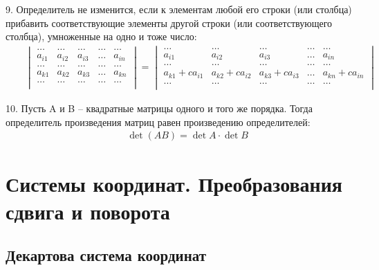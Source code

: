 \documentclass[12pt, fleqn]{extarticle}
\begin{document}
9. Определитель не изменится, если к элементам любой его строки (или столбца) прибавить соответствующие элементы другой строки (или соответствующего столбца), умноженные на одно и тоже число:
\begin{align*}
     &  &
    \begin{vmatrix}
        \dots  & \dots  & \dots  & \dots & \dots  \\
        a_{i1} & a_{i2} & a_{i3} & \dots & a_{in} \\
        \dots  & \dots  & \dots  & \dots & \dots  \\
        a_{k1} & a_{k2} & a_{k3} & \dots & a_{kn} \\
        \dots  & \dots  & \dots  & \dots & \dots  \\
    \end{vmatrix}
    =
    \begin{vmatrix}
        \dots            & \dots            & \dots            & \dots & \dots            \\
        a_{i1}           & a_{i2}           & a_{i3}           & \dots & a_{in}           \\
        \dots            & \dots            & \dots            & \dots & \dots            \\
        a_{k1} + ca_{i1} & a_{k2} + ca_{i2} & a_{k3} + ca_{i3} & \dots & a_{kn} + ca_{in} \\
        \dots            & \dots            & \dots            & \dots & \dots            \\
    \end{vmatrix}
\end{align*}

10. Пусть A и B – квадратные матрицы одного и того же порядка. Тогда определитель произведения матриц равен произведению определителей:
\begin{align*}
     &  &
    \det (AB) = \det A \cdot \det B
\end{align*}

\newpage

\section{Системы координат. Преобразования сдвига и поворота}
\label{sec:coordinate_systems}

\subsection*{Декартова система координат}
\end{document}
